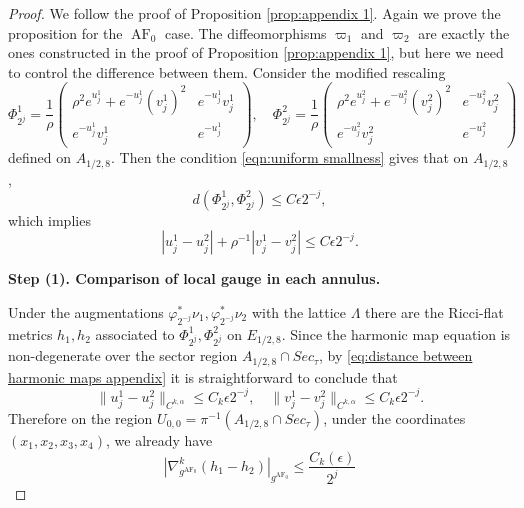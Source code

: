 \documentclass[a4paper,11pt]{amsart}
\theoremstyle{definition}
\numberwithin{equation}{section}
\DeclareMathOperator{\AF}{AF}
\begin{document}
\begin{proof}
    We follow the proof of Proposition \ref{prop:appendix 1}. Again we prove the proposition for the $\AF_0$ case.  The diffeomorphisms $\varpi_1$ and $\varpi_2$ are exactly the ones constructed in the proof of Proposition \ref{prop:appendix 1}, but here we need to control the difference between them. Consider the modified rescaling 
    $$\Phi_{2^j}^1=\frac{1}{\rho}\left(\begin{matrix}
        \rho^2e^{u_j^1}+e^{-u_j^1}(v_j^1)^2 & e^{-u_j^1}v_j^1 \\ e^{-u_j^1}v_j^1 & e^{-u_j^1} 
    \end{matrix}\right),\quad \Phi_{2^j}^2=\frac{1}{\rho}\left(\begin{matrix}
        \rho^2e^{u_j^2}+e^{-u_j^2}(v_j^2)^2 & e^{-u_j^2}v_j^2 \\ e^{-u_j^2}v_j^2 & e^{-u_j^2} 
    \end{matrix}\right)$$
    defined on $A_{1/2,8}$. Then the condition \eqref{eqn:uniform smallness} gives  that on $A_{1/2, 8}$, $$d(\Phi^1_{2^j},\Phi^2_{2^j})\leq C\epsilon2^{-j},$$ which implies
    \begin{equation}\label{eq:distance between harmonic maps appendix}
        |u_j^{1}-u_{j}^2|+\rho^{-1}|v_j^1-v_j^2|\leq C\epsilon 2^{-j}.
    \end{equation}


    \vspace{10pt}
    \noindent\textbf{Step (1). Comparison of local gauge in each annulus.} 
    \vspace{10pt}


    Under the augmentations $\varphi_{2^{-j}}^*\nu_1,\varphi_{2^{-j}}^*\nu_2$ with the lattice $\Lambda$ there are the Ricci-flat metrics $h_1,h_2$ associated to $\Phi^1_{2^j},\Phi^2_{2^j}$ on $E_{1/2,8}$. Since the harmonic map equation is non-degenerate over the sector region $A_{1/2,8}\cap Sec_\tau$, by \eqref{eq:distance between harmonic maps appendix} it is straightforward to conclude that 
    \begin{equation}\label{eq:compare u v epislon appendix}
        \|u_j^1-u_j^2\|_{C^{k,\alpha}}\leq C_k\epsilon 2^{-j},\quad \|v_j^1-v_j^2\|_{C^{k,\alpha}}\leq C_k\epsilon 2^{-j}.
    \end{equation}
    Therefore on the region $U_{0,0}=\pi^{-1}(A_{1/2,8}\cap Sec_\tau)$, under the coordinates $(x_1,x_2,x_3,x_4)$, we already have
    $$|\nabla^k_{g^{\AF_0}}(h_1-h_2)|_{g^{\AF_0}}\leq\frac{C_k(\epsilon)}{2^j}$$



\end{proof}
\end{document}
